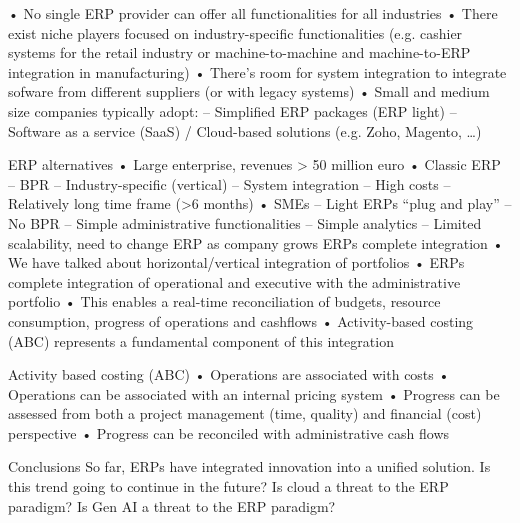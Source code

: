 • No single ERP provider can offer all functionalities for all industries
• There exist niche players focused on industry-specific functionalities (e.g. cashier
systems for the retail industry or machine-to-machine and machine-to-ERP integration
in manufacturing)
• There’s room for system integration to integrate sofware from different suppliers (or
with legacy systems)
• Small and medium size companies typically adopt:
– Simplified ERP packages (ERP light)
– Software as a service (SaaS) / Cloud-based solutions (e.g. Zoho, Magento, …)

ERP alternatives
• Large enterprise, revenues > 50
million euro
• Classic ERP
– BPR
– Industry-specific (vertical)
– System integration
– High costs
– Relatively long time frame (>6
months)
• SMEs
– Light ERPs “plug and play”
– No BPR
– Simple administrative
functionalities
– Simple analytics
– Limited scalability, need to change
ERP as company grows
ERPs complete integration
• We have talked about horizontal/vertical integration of portfolios
• ERPs complete integration of operational and executive with the administrative
portfolio
• This enables a real-time reconciliation of budgets, resource consumption, progress of
operations and cashflows
• Activity-based costing (ABC) represents a fundamental component of this integration

Activity based costing (ABC)
• Operations are associated with costs
• Operations can be associated with an internal pricing system
• Progress can be assessed from both a project management (time, quality) and financial
(cost) perspective
• Progress can be reconciled with administrative cash flows

Conclusions
So far, ERPs have integrated innovation into a unified solution.
Is this trend going to continue in the future?
Is cloud a threat to the ERP paradigm?
Is Gen AI a threat to the ERP paradigm?